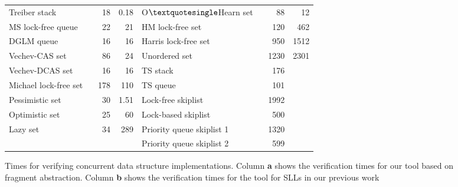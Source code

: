 \begin{figure}[]
\begin{tabular}{|l | r| r | l | r | r |}


\textsf{Treiber stack  ~\cite{Treiber:stack}} & \textsf {18} & \textsf {0.18} & \textsf {O$\textquotesingle $Hearn set  ~\cite{OHearnlist}} & \textsf{88} & \textsf{12} \\
\textsf{MS lock-free queue  ~\cite{MS:QueueAlgorithms}}& \textsf{22} & \textsf {21} & \textsf{HM lock-free set  ~\cite{ArtOfMpP} } & \textsf{120} & \textsf{462} \\
\textsf{DGLM queue  ~\cite{Doherty:lockfree}}&  \textsf {16} & \textsf{16} & \textsf{Harris lock-free set  ~\cite{Harris:list}} & \textsf{950} & \textsf {1512} \\
\textsf{Vechev-CAS set  ~\cite{Vechev:list}}  & \textsf{86} & \textsf {24} & \textsf{Unordered set  ~\cite{Zhang:unorderedlist}} & \textsf{1230} & \textsf {2301} \\
\cline{4-5}
\textsf{Vechev-DCAS set  ~\cite{Vechev:list}}   & \textsf{16} & \textsf{16} & \textsf{TS stack  ~\cite{ts-stack}}  & \textsf{176} &\\
\textsf{Michael lock-free set ~\cite{Michael:list}}  & \textsf{178} & \textsf{110} & \textsf{TS queue  ~\cite{ts-stack}} & \textsf{101} &\\
\cline{4-5}
\textsf{Pessimistic set  ~\cite{ArtOfMpP}}&\textsf{30} & \textsf{1.51} & \textsf{Lock-free skiplist   ~\cite{ArtOfMpP}}& \textsf{1992} & \\
\textsf{Optimistic set ~\cite{ArtOfMpP}}& \textsf{25} & \textsf{60} & \textsf{Lock-based skiplist ~\cite{lockskiplist}}& \textsf{500} & \\
\textsf{Lazy set ~\cite{Lazyset}}  & \textsf {34} & \textsf{289} & \textsf{Priority queue skiplist 1 ~\cite{Shavit:queue}} &\textsf{1320} & \\
& & &\textsf{Priority queue skiplist 2~\cite{Linden:opodis13}}  &  \textsf{599} &\\
\hline
\end{tabular}

\caption{Times for verifying concurrent data structure implementations.
Column {\bf a} shows the verification times for our tool based on fragment abstraction.
Column {\bf b} shows the verification times for the tool for SLLs in our previous
work~\protect\cite{Quy:sas16}}
\label{Experiments:fig}
\end{figure}
